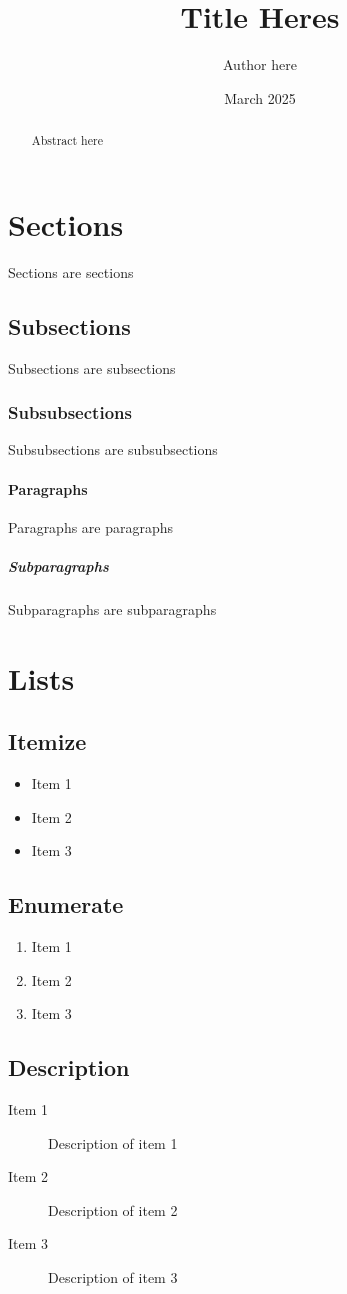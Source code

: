 \documentclass[12pt,twoside,a4paper]{article}
\begin{document}
\title{Title Heres}
\author{Author here}
\date{March 2025}
\maketitle

\begin{abstract}
Abstract here
\end{abstract}

\newpage

\tableofcontents
\newpage
\section{Sections}
Sections are sections
\subsection{Subsections}
Subsections are subsections
\subsubsection{Subsubsections}
Subsubsections are subsubsections
\paragraph{Paragraphs}
Paragraphs are paragraphs
\subparagraph{Subparagraphs}
Subparagraphs are subparagraphs
\section{Lists}
\subsection{Itemize}
\begin{itemize}
    \item Item 1
    \item Item 2
    \item Item 3
\end{itemize}
\subsection{Enumerate}
\begin{enumerate}
    \item Item 1
    \item Item 2
    \item Item 3
\end{enumerate}
\subsection{Description}
\begin{description}
    \item[Item 1] Description of item 1
    \item[Item 2] Description of item 2
    \item[Item 3] Description of item 3
\end{description}
\end{document}
